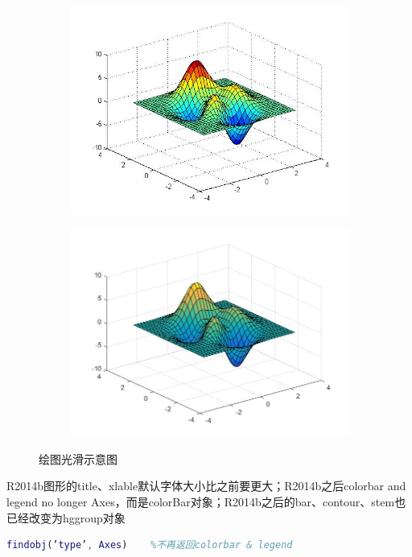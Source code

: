    \begin{figure}[H]
    \centering
    \begin{subfigure}[b]{0.4\textwidth}
        \includegraphics[width=\textwidth]{images/43.jpg}
        \caption{}
        \label{绘图光滑示意图1}
    \end{subfigure}
    \begin{subfigure}[b]{0.4\textwidth}
        \includegraphics[width=\textwidth]{images/42.jpg}
        \caption{}
        \label{绘图光滑示意图2}
    \end{subfigure}
    \caption{绘图光滑示意图}
    \end{figure}
    \par
    R2014b图形的title、xlable默认字体大小比之前要更大；R2014b之后colorbar and legend no longer Axes，而是colorBar对象；R2014b之后的bar、contour、stem也已经改变为hggroup对象
    \begin{lstlisting}[language=Matlab]
      findobj(’type’, Axes)    %不再返回colorbar & legend
    \end{lstlisting}
